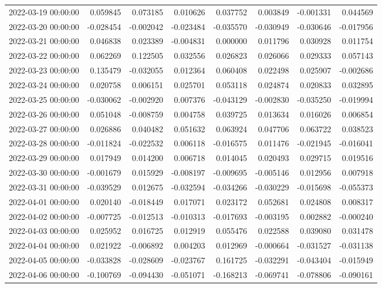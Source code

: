 \begin{tabular}{lrrrrrrr}
2022-03-19 00:00:00 & 0.059845 & 0.073185 & 0.010626 & 0.037752 & 0.003849 & -0.001331 & 0.044569 \\
2022-03-20 00:00:00 & -0.028454 & -0.002042 & -0.023484 & -0.035570 & -0.030949 & -0.030646 & -0.017956 \\
2022-03-21 00:00:00 & 0.046838 & 0.023389 & -0.004831 & 0.000000 & 0.011796 & 0.030928 & 0.011754 \\
2022-03-22 00:00:00 & 0.062269 & 0.122505 & 0.032556 & 0.026823 & 0.026066 & 0.029333 & 0.057143 \\
2022-03-23 00:00:00 & 0.135479 & -0.032055 & 0.012364 & 0.060408 & 0.022498 & 0.025907 & -0.002686 \\
2022-03-24 00:00:00 & 0.020758 & 0.006151 & 0.025701 & 0.053118 & 0.024874 & 0.020833 & 0.032895 \\
2022-03-25 00:00:00 & -0.030062 & -0.002920 & 0.007376 & -0.043129 & -0.002830 & -0.035250 & -0.019994 \\
2022-03-26 00:00:00 & 0.051048 & -0.008759 & 0.004758 & 0.039725 & 0.013634 & 0.016026 & 0.006854 \\
2022-03-27 00:00:00 & 0.026886 & 0.040482 & 0.051632 & 0.063924 & 0.047706 & 0.063722 & 0.038523 \\
2022-03-28 00:00:00 & -0.011824 & -0.022532 & 0.006118 & -0.016575 & 0.011476 & -0.021945 & -0.016041 \\
2022-03-29 00:00:00 & 0.017949 & 0.014200 & 0.006718 & 0.014045 & 0.020493 & 0.029715 & 0.019516 \\
2022-03-30 00:00:00 & -0.001679 & 0.015929 & -0.008197 & -0.009695 & -0.005146 & 0.012956 & 0.007918 \\
2022-03-31 00:00:00 & -0.039529 & 0.012675 & -0.032594 & -0.034266 & -0.030229 & -0.015698 & -0.055373 \\
2022-04-01 00:00:00 & 0.020140 & -0.018449 & 0.017071 & 0.023172 & 0.052681 & 0.024808 & 0.008317 \\
2022-04-02 00:00:00 & -0.007725 & -0.012513 & -0.010313 & -0.017693 & -0.003195 & 0.002882 & -0.000240 \\
2022-04-03 00:00:00 & 0.025952 & 0.016725 & 0.012919 & 0.055476 & 0.022588 & 0.039080 & 0.031478 \\
2022-04-04 00:00:00 & 0.021922 & -0.006892 & 0.004203 & 0.012969 & -0.000664 & -0.031527 & -0.031138 \\
2022-04-05 00:00:00 & -0.033828 & -0.028609 & -0.023767 & 0.161725 & -0.032291 & -0.043404 & -0.015949 \\
2022-04-06 00:00:00 & -0.100769 & -0.094430 & -0.051071 & -0.168213 & -0.069741 & -0.078806 & -0.090161 \\

\end{tabular}
